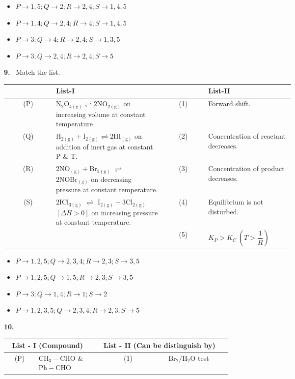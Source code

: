 \documentclass[10pt]{extarticle}
\newcommand{\qn}[1]{\par\smallskip\noindent\textbf{#1.}~}
\newenvironment{qoptions}{\begin{itemize}[leftmargin=1.8em,itemsep=1pt,topsep=2pt,label={}]}{\end{itemize}}
\newcommand{\opt}[2]{\item[(#1)] #2}
\begin{document}
\begin{multicols}{2}
\begin{qoptions}
\opt{A}{$P\to1,5;\allowbreak Q\to2;\allowbreak R\to2,4;\allowbreak S\to1,4,5$}
\opt{B}{$P\to1,4;\allowbreak Q\to2,4;\allowbreak R\to4;\allowbreak S\to1,4,5$}
\opt{C}{$P\to3;\allowbreak Q\to4;\allowbreak R\to2,4;\allowbreak S\to1,3,5$}
\opt{D}{$P\to3;\allowbreak Q\to2,4;\allowbreak R\to2,4;\allowbreak S\to5$}
\end{qoptions}
\qn{9} Match the list.\par
{\footnotesize\setlength{\tabcolsep}{2pt}\begin{tabular}{|c|p{0.38\linewidth}|c|p{0.3\linewidth}|}
\hline
 & \textbf{List-I} & & \textbf{List-II}\\ \hline
(P) & $\mathrm{N_2O_{4(g)}\rightleftharpoons2NO_{2(g)}}$ on increasing volume at constant temperature & (1) & Forward shift.\\ \hline
(Q) & $\mathrm{H_{2(g)}+I_{2(g)}\rightleftharpoons2HI_{(g)}}$ on addition of inert gas at constant P \& T. & (2) & Concentration of reactant decreases.\\ \hline
(R) & $\mathrm{2NO_{(g)}+Br_{2(g)}}$ $\rightleftharpoons$ $\mathrm{2NOBr_{(g)}}$ on decreasing pressure at constant temperature. & (3) & Concentration of product decreases.\\ \hline
(S) & $\mathrm{2ICl_{3(g)}}$ $\rightleftharpoons$ $\mathrm{I_{2(g)}+3Cl_{2(g)}}$ $[\Delta H>0]$ on increasing pressure at constant temperature. & (4) & Equilibrium is not disturbed.\\ \hline
 & & (5) & $K_P>K_C\ \left(T>\dfrac1R\right)$\\ \hline
\end{tabular}}\par
\begin{qoptions}
\opt{A}{$P\to1,2,5;\allowbreak Q\to2,3,4;\allowbreak R\to2,3;\allowbreak S\to3,5$}
\opt{B}{$P\to1,2,5;\allowbreak Q\to1,5;\allowbreak R\to2,3;\allowbreak S\to3,5$}
\opt{C}{$P\to3;\allowbreak Q\to1,4;\allowbreak R\to1;\allowbreak S\to2$}
\opt{D}{$P\to1,2,3,5;\allowbreak Q\to2,3,4;\allowbreak R\to2,3;\allowbreak S\to5$}
\end{qoptions}
\qn{10}
{\footnotesize\setlength{\tabcolsep}{2pt}\begin{tabular}{|c|p{0.25\linewidth}|c|p{0.28\linewidth}|}
\hline
\multicolumn{2}{|c|}{\textbf{List - I} (Compound)} & \multicolumn{2}{c|}{\textbf{List - II} (Can be distinguish by)}\\ \hline
(P) & $\mathrm{CH_3{-}CHO}$ \& $\mathrm{Ph{-}CHO}$ & (1) & $\mathrm{Br_2/H_2O}$ test\\ \hline

\end{tabular}}
\end{multicols}
\end{document}
